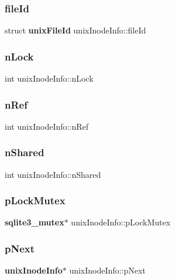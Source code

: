 \mbox{\label{structunix_inode_info_ae692731d449f4462a921dda9a061faa6}} 
\subsubsection{fileId}
{\footnotesize\ttfamily struct \textbf{ unix\+File\+Id} unix\+Inode\+Info\+::file\+Id}

\mbox{\label{structunix_inode_info_a477f3357a32adbc1a9b05017e535444d}} 
\subsubsection{nLock}
{\footnotesize\ttfamily int unix\+Inode\+Info\+::n\+Lock}

\mbox{\label{structunix_inode_info_a65cbd1fd05ed00f03a252266b04a8221}} 
\subsubsection{nRef}
{\footnotesize\ttfamily int unix\+Inode\+Info\+::n\+Ref}

\mbox{\label{structunix_inode_info_a0d7f8dd92964f53e59c8d741dbe00a61}} 
\subsubsection{nShared}
{\footnotesize\ttfamily int unix\+Inode\+Info\+::n\+Shared}

\mbox{\label{structunix_inode_info_a8b0bb0ff004f010fc6dc5ab0aa62019c}} 
\subsubsection{pLockMutex}
{\footnotesize\ttfamily \textbf{ sqlite3\+\_\+mutex}$\ast$ unix\+Inode\+Info\+::p\+Lock\+Mutex}

\mbox{\label{structunix_inode_info_a80181ba4ef71dd0d8e55e97baedc761e}} 
\subsubsection{pNext}
{\footnotesize\ttfamily \textbf{ unix\+Inode\+Info}$\ast$ unix\+Inode\+Info\+::p\+Next}

